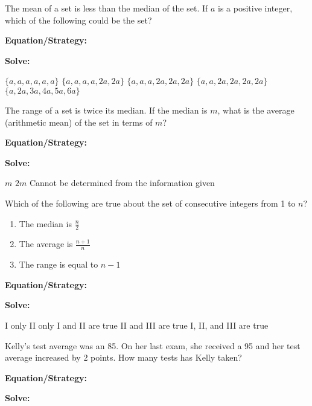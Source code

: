 \vfill
\newpage
\begin{multicols*}{2}
\begin{outline}[enumerate]
\medium

\1 The mean of a set is less than the median of the set. If $a$ is a positive integer, which of the following could be the set?

\bigskip
\textbf{Equation/Strategy:} \hrulefill

\bigskip
\textbf{Solve:}

\vfill
\2 $\{a,a,a,a,a,a\}$
\2 $\{a,a,a,a,2a,2a\}$
\2 $\{a,a,a,2a,2a,2a\}$
\2 $\{a,a,2a,2a,2a,2a\}$
\2 $\{a,2a,3a,4a,5a,6a\}$

\midline

\1 The range of a set is twice its median. If the median is $m$, what is the average (arithmetic mean) of the set in terms of $m$?

\bigskip
\textbf{Equation/Strategy:}

\bigskip
\textbf{Solve:}

\vfill
{}
\2 $m$
\2 $2m$
\2 Cannot be determined from the information given

\columnbreak
\advanced

\1 Which of the following are true about the set of consecutive integers from 1 to $n$?

\begin{enumerate}[label=\Roman*]
\item The median is $\frac{n}{2}$
\item The average is $\frac{n+1}{n}$
\item The range is equal to $n-1$
\end{enumerate}

\bigskip
\textbf{Equation/Strategy:} \hrulefill

\bigskip
\textbf{Solve:}

\vfill
\2 I only
\2 II only
\2 I and II are true
\2 II and III are true
\2 I, II, and III are true

\midline

\1 Kelly's test average was an 85. On her last exam, she received a 95 and her test average increased by 2 points. How many tests has Kelly taken?

\bigskip
\textbf{Equation/Strategy:} \hrulefill

\bigskip
\textbf{Solve:}

\vfill
{}
\end{outline}
\end{multicols*}